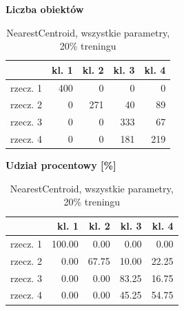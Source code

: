 \documentclass[11pt,a4paper]{article}
\begin{document}
\begin{table}[H]
\centering
\small
\caption{NearestCentroid, wszystkie parametry, 20\% treningu}
\begin{minipage}{0.47\textwidth}
\centering
\textbf{Liczba obiektów}\\[0.35em]
\begin{tabular}{lrrrr}
\toprule
 & kl. 1 & kl. 2 & kl. 3 & kl. 4 \\
\midrule
rzecz. 1 & 400 & 0 & 0 & 0 \\
rzecz. 2 & 0 & 271 & 40 & 89 \\
rzecz. 3 & 0 & 0 & 333 & 67 \\
rzecz. 4 & 0 & 0 & 181 & 219 \\
\bottomrule
\end{tabular}
\end{minipage}\hfill
\begin{minipage}{0.47\textwidth}
\centering
\textbf{Udział procentowy [\%]}\\[0.35em]
\begin{tabular}{lrrrr}
\toprule
 & kl. 1 & kl. 2 & kl. 3 & kl. 4 \\
\midrule
rzecz. 1 & 100.00 & 0.00 & 0.00 & 0.00 \\
rzecz. 2 & 0.00 & 67.75 & 10.00 & 22.25 \\
rzecz. 3 & 0.00 & 0.00 & 83.25 & 16.75 \\
rzecz. 4 & 0.00 & 0.00 & 45.25 & 54.75 \\
\bottomrule
\end{tabular}
\end{minipage}
\end{table}
\end{document}
